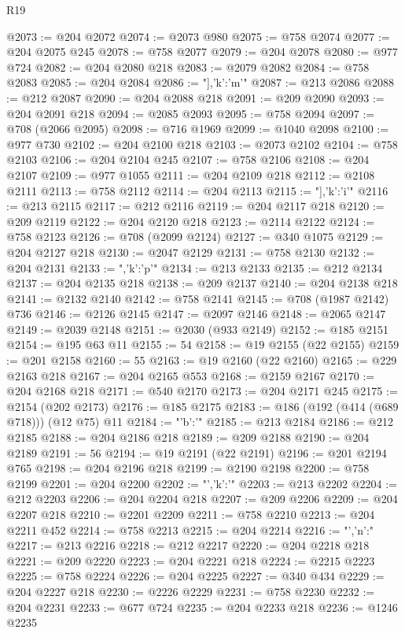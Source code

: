 \begin{lexlean}{R19}
\begin{coremodule}
{{{{{{{@2073 := @204 @2072
@2074 := @2073 @980
@2075 := @758 @2074
@2077 := @204 @2075 @245
@2078 := @758 @2077
@2079 := @204 @2078
@2080 := @977 @724
@2082 := @204 @2080 @218
@2083 := @2079 @2082
@2084 := @758 @2083
@2085 := @204 @2084
@2086 := "],'k':'m'}"
@2087 := @213 @2086
@2088 := @212 @2087
@2090 := @204 @2088 @218
@2091 := @209 @2090
@2093 := @204 @2091 @218
@2094 := @2085 @2093
@2095 := @758 @2094
@2097 := @708 (@2066 @2095)
@2098 := @716 @1969
@2099 := @1040 @2098
@2100 := @977 @730
@2102 := @204 @2100 @218
@2103 := @2073 @2102
@2104 := @758 @2103
@2106 := @204 @2104 @245
@2107 := @758 @2106
@2108 := @204 @2107
@2109 := @977 @1055
@2111 := @204 @2109 @218
@2112 := @2108 @2111
@2113 := @758 @2112
@2114 := @204 @2113
@2115 := "],'k':'i'}"
@2116 := @213 @2115
@2117 := @212 @2116
@2119 := @204 @2117 @218
@2120 := @209 @2119
@2122 := @204 @2120 @218
@2123 := @2114 @2122
@2124 := @758 @2123
@2126 := @708 (@2099 @2124)
@2127 := @340 @1075
@2129 := @204 @2127 @218
@2130 := @2047 @2129
@2131 := @758 @2130
@2132 := @204 @2131
@2133 := ",'k':'p'}"
@2134 := @213 @2133
@2135 := @212 @2134
@2137 := @204 @2135 @218
@2138 := @209 @2137
@2140 := @204 @2138 @218
@2141 := @2132 @2140
@2142 := @758 @2141
@2145 := @708 (@1987 @2142) @736
@2146 := @2126 @2145
@2147 := @2097 @2146
@2148 := @2065 @2147
@2149 := @2039 @2148
@2151 := @2030 (@933 @2149)
@2152 := @185 @2151
@2154 := @195 @63 @11
@2155 := 54
@2158 := @19 @2155 (@22 @2155)
@2159 := @201 @2158
@2160 := 55
@2163 := @19 @2160 (@22 @2160)
@2165 := @229 @2163 @218
@2167 := @204 @2165 @553
@2168 := @2159 @2167
@2170 := @204 @2168 @218
@2171 := @540 @2170
@2173 := @204 @2171 @245
@2175 := @2154 (@202 @2173)
@2176 := @185 @2175
@2183 := @186 (@192 (@414 (@689 @718))) (@12 @75) @11
@2184 := "{'b':'"
@2185 := @213 @2184
@2186 := @212 @2185
@2188 := @204 @2186 @218
@2189 := @209 @2188
@2190 := @204 @2189
@2191 := 56
@2194 := @19 @2191 (@22 @2191)
@2196 := @201 @2194 @765
@2198 := @204 @2196 @218
@2199 := @2190 @2198
@2200 := @758 @2199
@2201 := @204 @2200
@2202 := "','k':'"
@2203 := @213 @2202
@2204 := @212 @2203
@2206 := @204 @2204 @218
@2207 := @209 @2206
@2209 := @204 @2207 @218
@2210 := @2201 @2209
@2211 := @758 @2210
@2213 := @204 @2211 @452
@2214 := @758 @2213
@2215 := @204 @2214
@2216 := "','n':"
@2217 := @213 @2216
@2218 := @212 @2217
@2220 := @204 @2218 @218
@2221 := @209 @2220
@2223 := @204 @2221 @218
@2224 := @2215 @2223
@2225 := @758 @2224
@2226 := @204 @2225
@2227 := @340 @434
@2229 := @204 @2227 @218
@2230 := @2226 @2229
@2231 := @758 @2230
@2232 := @204 @2231
@2233 := @677 @724
@2235 := @204 @2233 @218
@2236 := @1246 @2235
}}}}}
\end{coremodule}
\end{lexlean}
